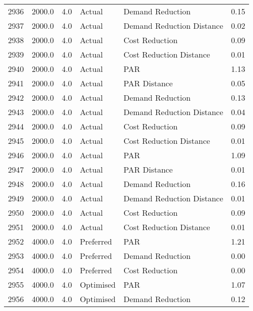 \begin{longtable}{lrrllr}
2936 &       2000.0 &     4.0 &         Actual &           Demand Reduction &   0.15 \\
2937 &       2000.0 &     4.0 &         Actual &  Demand Reduction Distance &   0.02 \\
2938 &       2000.0 &     4.0 &         Actual &             Cost Reduction &   0.09 \\
2939 &       2000.0 &     4.0 &         Actual &    Cost Reduction Distance &   0.01 \\
2940 &       2000.0 &     4.0 &         Actual &                        PAR &   1.13 \\
2941 &       2000.0 &     4.0 &         Actual &               PAR Distance &   0.05 \\
2942 &       2000.0 &     4.0 &         Actual &           Demand Reduction &   0.13 \\
2943 &       2000.0 &     4.0 &         Actual &  Demand Reduction Distance &   0.04 \\
2944 &       2000.0 &     4.0 &         Actual &             Cost Reduction &   0.09 \\
2945 &       2000.0 &     4.0 &         Actual &    Cost Reduction Distance &   0.01 \\
2946 &       2000.0 &     4.0 &         Actual &                        PAR &   1.09 \\
2947 &       2000.0 &     4.0 &         Actual &               PAR Distance &   0.01 \\
2948 &       2000.0 &     4.0 &         Actual &           Demand Reduction &   0.16 \\
2949 &       2000.0 &     4.0 &         Actual &  Demand Reduction Distance &   0.01 \\
2950 &       2000.0 &     4.0 &         Actual &             Cost Reduction &   0.09 \\
2951 &       2000.0 &     4.0 &         Actual &    Cost Reduction Distance &   0.01 \\
2952 &       4000.0 &     4.0 &      Preferred &                        PAR &   1.21 \\
2953 &       4000.0 &     4.0 &      Preferred &           Demand Reduction &   0.00 \\
2954 &       4000.0 &     4.0 &      Preferred &             Cost Reduction &   0.00 \\
2955 &       4000.0 &     4.0 &      Optimised &                        PAR &   1.07 \\
2956 &       4000.0 &     4.0 &      Optimised &           Demand Reduction &   0.12 \\

\end{longtable}
